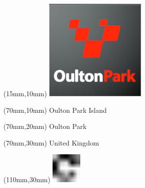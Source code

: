 \null\newpage
\begin{textblock*}{50mm}(15mm,10mm)%
\includegraphics[width=50mm]{LG/2015-05-20_00091.png}
\end{textblock*}
\begin{textblock*}{130mm}(70mm,10mm)%
{\fontsize{20}{20}\selectfont Oulton Park Island}\\
\end{textblock*}
\begin{textblock*}{120mm}(70mm,20mm)%
{\fontsize{16}{16}\selectfont Oulton Park}\\
\end{textblock*}
\begin{textblock*}{120mm}(70mm,30mm)%
{\fontsize{12}{12}\selectfont United Kingdom}
\end{textblock*}
\begin{textblock*}{30mm}(110mm,30mm)%
\centering
\includegraphics[height=15mm]{icons/fa-rotate-right.pdf}
\end{textblock*}
